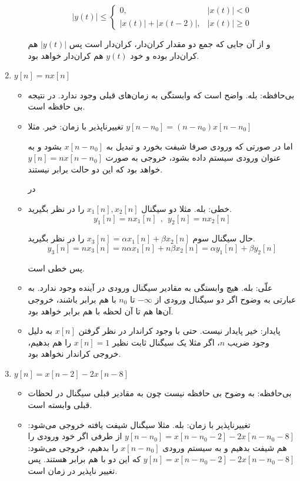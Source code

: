 \documentclass[12pt]{article}
\begin{document}
\begin{enumerate}[label = \harfi*)]
\begin{itemize}
	$$
	|y(t)| \leq\left\{\begin{array}{ll}
		0, & |x(t)|<0 \\
		|x(t)|+|x(t-2)|, & |x(t)| \geq 0
	\end{array}\right.
	$$
	
	و از آن جایی که جمع دو مقدار کران‌دار، کران‌دار است پس $|y(t)|$ هم کران‌دار بوده و خود $y(t)$ هم کران‌دار خواهد بود.
	
	
\end{itemize}




\item
$y[n] = n x[n]$
\begin{itemize}
	\item
	بی‌حافظه: بله. واضح است که وابستگی به زمان‌های قبلی وجود ندارد. در نتیجه بی حافظه است.
	\item
	تغییرناپذیر با زمان: 
	خیر. مثلا 
	$y[n-n_0] = (n - n_0) x[n - n_0]$
	
	اما در صورتی که ورودی صرفا شیفت بخورد و تبدیل به $x[n-n_0]$ بشود و به عنوان ورودی سیستم داده بشود، خروجی به صورت
	$y[n]= n x[n-n_0]$
	خواهد بود که این دو حالت برابر نیستند.
	
	در 
	\item
	خطی: بله. مثلا دو سیگنال
	$x_1[n],x_2[n]$
	را در نظر بگیرید.
	$$y_1[n] = nx_1[n] ~~ , ~~ y_2[n] = n x_2[n]$$
	
	حال سیگنال سوم
	$x_3 [n] = \alpha x_1[n] + \beta x_2 [n]$
	را در نظر بگیرید.
	$$y_3[n] = n x_3[n] = n \alpha x_1[n] + n \beta x_2[n] = \alpha y_1[n] + \beta y_2[n]$$
	
	پس خطی است.
	\item
	علّی: بله. هیچ وابستگی به مقادیر سیگنال ورودی در آینده وجود ندارد. به عبارتی به وضوح اگر دو سیگنال ورودی از $-\infty$ تا $n_0$ با هم برابر باشند، خروجی آن‌ها هم تا آن لحظه با هم برابر خواهد بود. 
	\item
	پایدار: خیر پایدار نیست. حتی با وجود کراندار در نظر گرفتن $x[n]$ به دلیل وجود ضریب $n$، اگر مثلا یک سیگنال ثابت نظیر $x[n]=1$ را هم بدهیم، خروجی کراندار نخواهد بود.
\end{itemize}



\item
$y[n] = x[n-2] - 2x[n-8]$
\begin{itemize}
	\item
	بی‌حافظه: به وضوح بی حافظه نیست چون به مقادیر قبلی سیگنال در لحظات قبلی وابسته است.
	\item
	تغییرناپذیر با زمان: بله. مثلا سیگنال شیفت یافته خروجی می‌شود:
	$y[n-n_0] = x[n - n_0 - 2] - 2 x[n - n_0 - 8]$
از طرفی اگر خود ورودی را هم شیفت بدهیم و به سیستم ورودی
 $x[n-n_0]$
 را بدهیم، خروجی می‌شود:
 $y[n] = x[n-n_0 - 2] - 2 x[n-n_0 - 8]$
 که این دو با هم برابر هستند. پس تغییر ناپذیر در زمان است.
	 

\end{itemize}
\end{enumerate}
\end{document}
